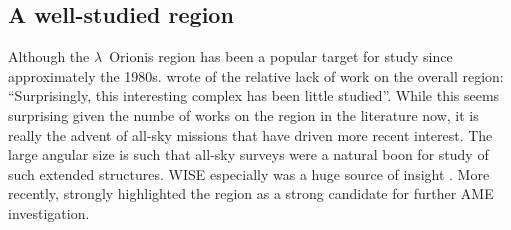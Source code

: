   \subsection{A well-studied region}
    Although the $\lambda$~Orionis region has been a popular target for study since approximately the 1980s.\cite{duerr82} wrote of the relative lack of work on the overall region: ``Surprisingly, this interesting complex has been little studied''. While this seems surprising given the numbe of works on the region in the literature now, it is really the advent of all-sky missions that have driven more recent interest.  The large angular size is such that all-sky surveys were a natural boon for study of such extended structures. WISE especially was a huge source of insight \citep{koenig15}. More recently, \cite{planck15XXV} strongly highlighted the region as a strong candidate for further AME investigation.

